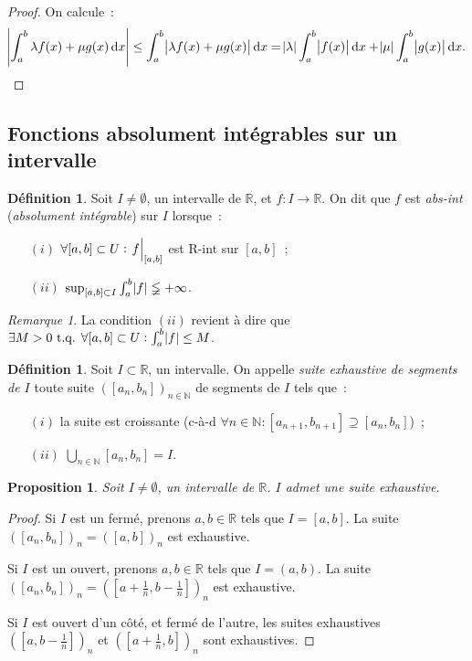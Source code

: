 \documentclass{report}
\newtheorem{prp}[thm]{Proposition}
\theoremstyle{definition}
\newtheorem{déf}[thm]{Définition}
\theoremstyle{remark}
\newtheorem*{rmq}{Remarque}
\numberwithin{equation}{section}
\newcommand{\R}{\mathbb R}
\newcommand{\N}{\mathbb N}
\newcommand{\tq}{\text{ t.q. }}
\newcommand{\restr}[2]{\left.#1\vphantom{\big|}\right|_{#2}}
\newcommand{\pinfty}{{+\infty}}
\begin{document}
			\begin{proof} On calcule~:
			\begin{equation}
				\abs {\int_a^b \lambda f(x) + \mu g(x)\dif x} \leq \int_a^b\abs {\lambda f(x) + \mu g(x)}\dif x
				= \abs \lambda\int_a^b\abs {f(x)}\dif x + \abs \mu\int_a^b\abs {g(x)}\dif x.
			\end{equation}
			\end{proof}

		\subsection{Fonctions absolument intégrables sur un intervalle}
			\begin{déf} Soit $I \neq \emptyset$, un intervalle de $\R$, et $f : I \to \R$. On dit que $f$ est \textit{abs-int} (\textit{absolument intégrable})
			sur $I$ lorsque~:
			\begin{itemize}
				\item[$(i)$] $\forall [a, b] \subset U : \restr f{[a, b]}$ est R-int sur $[a, b]$~;
				\item[$(ii)$] $\sup_{[a, b] \subset I} \int_a^b \abs f \lneqq \pinfty$.
			\end{itemize}
			\end{déf}

			\begin{rmq} La condition $(ii)$ revient à dire que $\exists M > 0 \tq \forall [a, b] \subset U : \int_a^b \abs f \leq M$.
			\end{rmq}

			\begin{déf} Soit $I \subset \R$, un intervalle. On appelle \textit{suite exhaustive de segments de $I$} toute suite $([a_n, b_n])_{n \in \N}$ de
			segments de $I$ tels que~:
			\begin{itemize}
				\item[$(i)$]  la suite est croissante (c-à-d $\forall n \in \N : [a_{n+1}, b_{n+1}] \supseteq [a_n, b_n]$)~;
				\item[$(ii)$] $\bigcup_{n \in \N}[a_n, b_n] = I$.
			\end{itemize}
			\end{déf}

			\begin{prp} Soit $I \neq \emptyset$, un intervalle de $\R$. $I$ admet une suite exhaustive.
			\end{prp}

			\begin{proof} Si $I$ est un fermé, prenons $a, b \in \R$ tels que $I = [a, b]$. La suite $([a_n, b_n])_n = ([a, b])_n$ est exhaustive.

			Si $I$ est un ouvert, prenons $a, b \in \R$ tels que $I = (a, b)$. La suite $([a_n, b_n])_n = ([a + \frac 1n, b - \frac 1n])_n$ est exhaustive.

			Si $I$ est ouvert d'un côté, et fermé de l'autre, les suites exhaustives $([a, b-\frac 1n])_n$ et $([a + \frac 1n, b])_n$ sont exhaustives.
			\end{proof}
\end{document}
